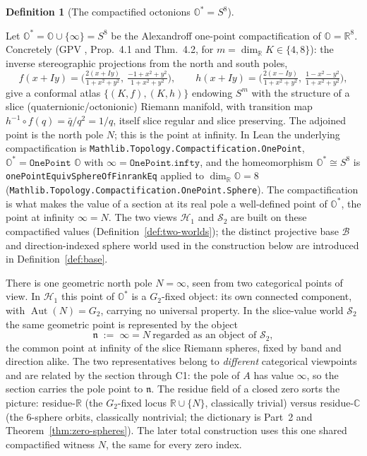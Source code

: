 \documentclass[11pt]{article}
\newcommand{\OO}{\mathbb{O}}
\newcommand{\CC}{\mathbb{C}}
\newcommand{\RR}{\mathbb{R}}
\DeclareMathOperator{\Aut}{Aut}
\providecommand{\Gtwo}{G_2}
\providecommand{\nfr}{\mathfrak{n}}
\providecommand{\lean}[1]{}
\theoremstyle{plain}
\theoremstyle{definition}
\newtheorem{definition}[theorem]{Definition}
\theoremstyle{remark}
\begin{document}
\begin{definition}[The compactified octonions $\OO^{*}=S^8$]\label{def:carrier}
\lean{Octonion, onePointEquivSphereOfFinrankEq}
Let $\OO^{*}=\OO\cup\{\infty\}=S^8$ be the Alexandroff one-point compactification of $\OO=\RR^8$.
Concretely (GPV \cite{VS}, Prop.~4.1 and Thm.~4.2, for $m=\dim_{\RR}K\in\{4,8\}$): the inverse
stereographic projections from the north and south poles,
\[
f(x+Iy)=\Big(\tfrac{2(x+Iy)}{1+x^2+y^2},\ \tfrac{-1+x^2+y^2}{1+x^2+y^2}\Big),\qquad
h(x+Iy)=\Big(\tfrac{2(x-Iy)}{1+x^2+y^2},\ \tfrac{1-x^2-y^2}{1+x^2+y^2}\Big),
\]
give a conformal atlas $\{(K,f),(K,h)\}$ endowing $S^m$ with the structure of a slice
(quaternionic/octonionic) Riemann manifold, with transition map $h^{-1}\circ f(q)=\bar q/q^2=1/q$,
itself slice regular and slice preserving. The adjoined point is the north pole $N$; this is the
point at infinity. In Lean the underlying compactification is
\texttt{Mathlib.\-Topology.\-Compactification.\-OnePoint}, $\OO^{*}=\texttt{OnePoint }\OO$ with
$\infty=\texttt{OnePoint.infty}$, and the homeomorphism $\OO^{*}\cong S^8$ is
\texttt{onePoint\-Equiv\-Sphere\-Of\-Finrank\-Eq} applied to $\dim_{\RR}\OO=8$
(\texttt{Mathlib.\-Topology.\-Compactification.\-OnePoint.\-Sphere}). The compactification is what makes
the value of a section at its real pole a well-defined point of $\OO^{*}$, the point at
infinity $\infty=N$. The two views $\mathcal H_1$ and $\mathcal S_2$ are built on
these compactified values (Definition~\ref{def:two-worlds}); the distinct projective base
$\mathcal B$ and direction-indexed sphere world used in the construction below are introduced in
Definition~\ref{def:base}.
\end{definition}

There is one geometric north pole $N=\infty$, seen from two categorical points of view. In
$\mathcal H_1$ this point of $\OO^{*}$ is a $\Gtwo$-fixed object: its own connected component,
with $\Aut(N)=\Gtwo$, carrying no universal property. In the slice-value world
$\mathcal S_2$ the same geometric point is represented by the object
\[
  \nfr\;:=\;\infty=N\ \text{regarded as an object of }\mathcal S_2,
\]
the common point at infinity of the slice Riemann spheres, fixed by band and direction alike.
The two representatives belong to \emph{different} categorical viewpoints and are related by the section
through \textup{C1}: the pole of $A$ has value $\infty$, so the section carries the pole point
to $\nfr$. The residue field of a closed zero sorts the picture:
residue-$\RR$ (the $\Gtwo$-fixed locus $\RR\cup\{N\}$, classically trivial) versus residue-$\CC$
(the $6$-sphere orbits, classically nontrivial; the dictionary is Part~2 and
Theorem~\ref{thm:zero-spheres}).
The later total construction uses this one shared compactified witness $N$, the same for every
zero index.
\end{document}
